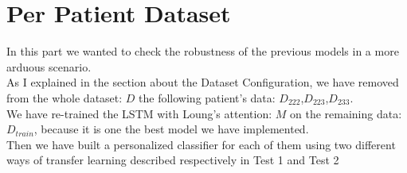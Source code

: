 \documentclass[LaM,binding=0.6cm]{sapthesis}
\begin{document}
\section{Per Patient Dataset}
In this part we wanted to check the robustness of the previous models in a more arduous scenario.\\As I explained in the section about the Dataset Configuration, we have removed from the whole dataset: $D$ the following patient's data: $D_{222}$,$D_{223}$,$D_{233}$.\\We have re-trained the LSTM with Loung's attention: $M$ on the remaining data: $D_{train}$, because it is one the best model we have implemented.\\Then we have built a personalized classifier for each of them using two different ways of transfer learning described respectively in Test 1 and Test 2
\end{document}

